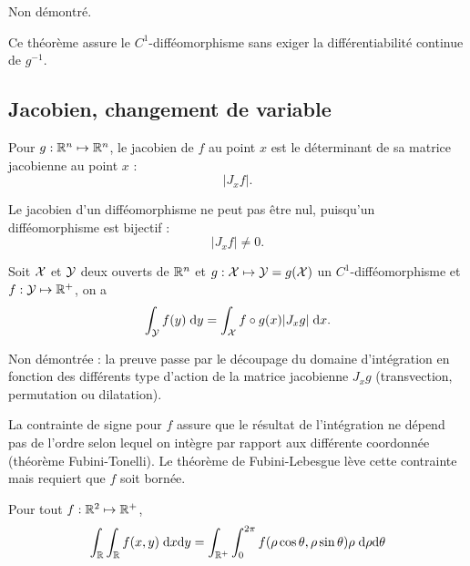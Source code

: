 \proof Non démontré. \eproof

\remark
Ce théorème assure le $C^1$-difféomorphisme sans exiger la différentiabilité continue de $g^{-1}$.

\subsection{Jacobien, changement de variable}

\begin{definition}[Jacobien]
  Pour $g : \mathbb{R}^n \mapsto \mathbb{R}^n$, le jacobien de $f$ au point $x$ est le déterminant de sa matrice jacobienne au point $x$ : 
  $$
  |J_x f|.
  $$
\end{definition}

\remark
Le jacobien d'un difféomorphisme ne peut pas être nul, puisqu'un difféomorphisme est bijectif :
$$
|J_x f| \neq 0.
$$

\begin{theorem}
  Soit $\mathcal{X}$ et $\mathcal{Y}$ deux ouverts de $\mathbb{R}^n$ et $g : \mathcal{X} \mapsto \mathcal{Y} = g(\mathcal{X})$ un $C^1$-difféomorphisme et $f : \mathcal{Y} \mapsto \mathbb{R}^+$, on a 
  $$
  \int_{\mathcal{Y}} f(y) \; \text{d} y = \int_{\mathcal{X}} f \circ g(x) |J_x g| \; \text{d} x.
  $$
\end{theorem}

\proof
Non démontrée : la preuve passe par le découpage du domaine d'intégration en fonction des différents type d'action de la matrice jacobienne $J_x g$ (transvection, permutation ou
dilatation).
\eproof

\remark
La contrainte de signe pour $f$ assure que le résultat de l'intégration ne dépend pas de l'ordre selon lequel on intègre par rapport aux différente coordonnée (théorème Fubini-Tonelli). Le théorème de Fubini-Lebesgue lève cette contrainte mais requiert que $f$ soit bornée.

\begin{corollary*}
  Pour tout $f : \mathbb{R}^2 \mapsto \mathbb{R}^+$, 
  $$
  \int_{\mathbb{R}} \int_{\mathbb{R}} f(x, y) \; \text{d} x \text{d} y
  = \int_{\mathbb{R}^+} \int_0^{2 \pi} f(\rho \cos \theta, \rho \sin \theta) \rho \; \text{d} \rho \text{d} \theta
  $$
\end{corollary*}

